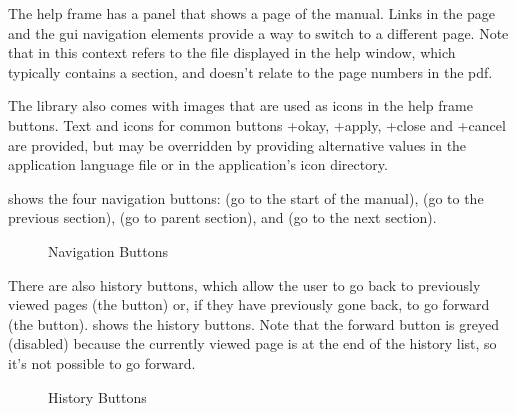 \documentclass[toc=listof]{scrreport}
\begin{document}
The help frame has a panel that shows a page of the manual.  Links
in the page and the \gls{gui} navigation elements provide a way to
switch to a different page.  Note that  in this context
refers to the file displayed in the help window, which typically
contains a section, and doesn't relate to the page numbers in the
\gls{pdf}.

The library also comes with images that are used as icons in the
help frame buttons. Text and icons for common buttons 
\widget+{okay}, \widget+{apply}, \widget+{close} and
\widget+{cancel} are provided, but may be overridden by
providing alternative values in the application language file
or in the application's icon directory.

 shows the four navigation
buttons:  (go to the start of the manual), 
 (go to the previous section), 
 (go to parent section), and 
 (go
to the next section).

\begin{figure}
\centering
{}
\caption{Navigation Buttons}
\label{fig:navbuttons}
\end{figure}

There are also history buttons, which allow the user to go back to
previously viewed pages (the 
button) or, if they have previously gone back, to go
forward (the  button).
 shows the history buttons.
Note that the forward button is greyed (disabled) because the
currently viewed page is at the end of the history list, so it's not
possible to go forward.

\begin{figure}
\centering
{}

\caption{History Buttons}
\label{fig:historybuttons}
\end{figure}
\end{document}
